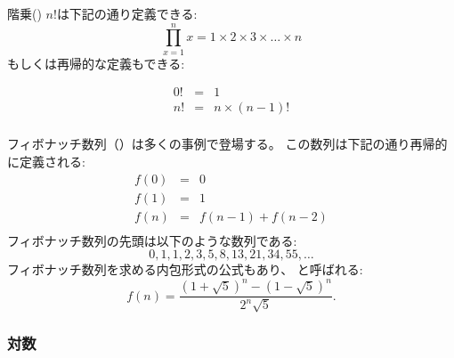 階乗() $n!$は下記の通り定義できる:
\[\prod_{x=1}^n x = 1 \times 2 \times 3 \times \ldots \times n\]
もしくは再帰的な定義もできる:

\[
\begin{array}{lcl}
0! & = & 1 \\
n! & = & n \times (n-1)! \\
\end{array}
\]


\begin{comment}
The \key{Fibonacci numbers}
arise in many situations.
They can be defined recursively as follows:
\[
\begin{array}{lcl}
f(0) & = & 0 \\
f(1) & = & 1 \\
f(n) & = & f(n-1)+f(n-2) \\
\end{array}
\]
The first Fibonacci numbers are
\[0, 1, 1, 2, 3, 5, 8, 13, 21, 34, 55, \ldots\]
There is also a closed-form formula
for calculating Fibonacci numbers, which is sometimes called
\index{Binet's formula} \key{Binet's formula}:
\[f(n)=\frac{(1 + \sqrt{5})^n - (1-\sqrt{5})^n}{2^n \sqrt{5}}.\]
\end{comment}

フィボナッチ数列（）は多くの事例で登場する。
この数列は下記の通り再帰的に定義される:
\[
\begin{array}{lcl}
f(0) & = & 0 \\
f(1) & = & 1 \\
f(n) & = & f(n-1)+f(n-2) \\
\end{array}
\]
フィボナッチ数列の先頭は以下のような数列である:
\[0, 1, 1, 2, 3, 5, 8, 13, 21, 34, 55, \ldots\]
フィボナッチ数列を求める内包形式の公式もあり、 と呼ばれる:
\[f(n)=\frac{(1 + \sqrt{5})^n - (1-\sqrt{5})^n}{2^n \sqrt{5}}.\]

\begin{comment}
\subsubsection{Logarithms}
\end{comment}
\subsubsection{対数}

